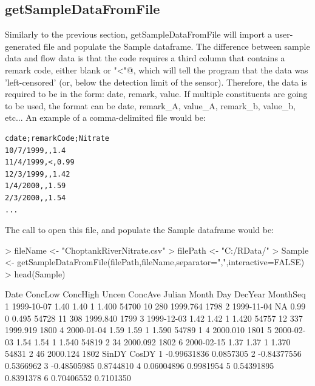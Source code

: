 \documentclass[a4paper,11pt]{article}
\begin{document}
\subsection{getSampleDataFromFile}
Similarly to the previous section, getSampleDataFromFile will import a user-generated file and populate the Sample dataframe. The difference between sample data and flow data is that the code requires a third column that contains a remark code, either blank or \verb@"<"@, which will tell the program that the data was 'left-censored' (or, below the detection limit of the sensor). Therefore, the data is required to be in the form: date, remark, value.  If multiple constituents are going to be used, the format can be date, remark\_A, value\_A, remark\_b, value\_b, etc... An example of a comma-delimited file would be:

\begin{verbatim}
cdate;remarkCode;Nitrate
10/7/1999,,1.4
11/4/1999,<,0.99
12/3/1999,,1.42
1/4/2000,,1.59
2/3/2000,,1.54
...
\end{verbatim}
The call to open this file, and populate the Sample dataframe would be:
\begin{Schunk}
\begin{Sinput}
> fileName <- "ChoptankRiverNitrate.csv"
> filePath <-  "C:/RData/"
> Sample <- getSampleDataFromFile(filePath,fileName,separator=",",interactive=FALSE)
> head(Sample)
\end{Sinput}
\begin{Soutput}
        Date ConcLow ConcHigh Uncen ConcAve Julian Month Day  DecYear MonthSeq
1 1999-10-07    1.40     1.40     1   1.400  54700    10 280 1999.764     1798
2 1999-11-04      NA     0.99     0   0.495  54728    11 308 1999.840     1799
3 1999-12-03    1.42     1.42     1   1.420  54757    12 337 1999.919     1800
4 2000-01-04    1.59     1.59     1   1.590  54789     1   4 2000.010     1801
5 2000-02-03    1.54     1.54     1   1.540  54819     2  34 2000.092     1802
6 2000-02-15    1.37     1.37     1   1.370  54831     2  46 2000.124     1802
        SinDY     CosDY
1 -0.99631836 0.0857305
2 -0.84377556 0.5366962
3 -0.48505985 0.8744810
4  0.06004896 0.9981954
5  0.54391895 0.8391378
6  0.70406552 0.7101350
\end{Soutput}
\end{Schunk}


\newpage
\end{document}
